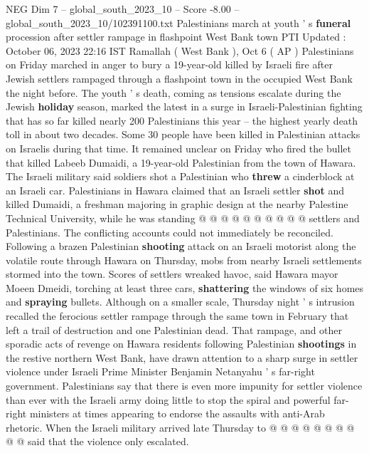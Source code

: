 \begin{textsample}{NEG Dim 7 – global\_south\_2023\_10 – Score -8.00 – global\_south\_2023\_10/102391100.txt}  \label{ex:f7_neg_316}
Palestinians march at youth ' s \textbf{funeral} procession after settler rampage in flashpoint West Bank town PTI Updated : October 06, 2023 22:16 IST Ramallah ( West Bank ), Oct 6 ( AP ) Palestinians on Friday marched in anger to bury a 19-year-old killed by Israeli fire after Jewish settlers rampaged through a flashpoint town in the occupied West Bank the night before.
The youth ' s death, coming as tensions escalate during the Jewish \textbf{holiday} season, marked the latest in a surge in Israeli-Palestinian fighting that has so far killed nearly 200 Palestinians this year -- the highest yearly death toll in about two decades.
Some 30 people have been killed in Palestinian attacks on Israelis during that time.
It remained unclear on Friday who fired the bullet that killed Labeeb Dumaidi, a 19-year-old Palestinian from the town of Hawara.
The Israeli military said soldiers shot a Palestinian who \textbf{threw} a cinderblock at an Israeli car.
Palestinians in Hawara claimed that an Israeli settler \textbf{shot} and killed Dumaidi, a freshman majoring in graphic design at the nearby Palestine Technical University, while he was standing @ @ @ @ @ @ @ @ @ @ settlers and Palestinians.
The conflicting accounts could not immediately be reconciled.
Following a brazen Palestinian \textbf{shooting} attack on an Israeli motorist along the volatile route through Hawara on Thursday, mobs from nearby Israeli settlements stormed into the town.
Scores of settlers wreaked havoc, said Hawara mayor Moeen Dmeidi, torching at least three cars, \textbf{shattering} the windows of six homes and \textbf{spraying} bullets.
Although on a smaller scale, Thursday night ' s intrusion recalled the ferocious settler rampage through the same town in February that left a trail of destruction and one Palestinian dead.
That rampage, and other sporadic acts of revenge on Hawara residents following Palestinian \textbf{shootings} in the restive northern West Bank, have drawn attention to a sharp surge in settler violence under Israeli Prime Minister Benjamin Netanyahu ' s far-right government.
Palestinians say that there is even more impunity for settler violence than ever with the Israeli army doing little to stop the spiral and powerful far-right ministers at times appearing to endorse the assaults with anti-Arab rhetoric.
When the Israeli military arrived late Thursday to @ @ @ @ @ @ @ @ @ @ said that the violence only escalated.

\end{textsample}
